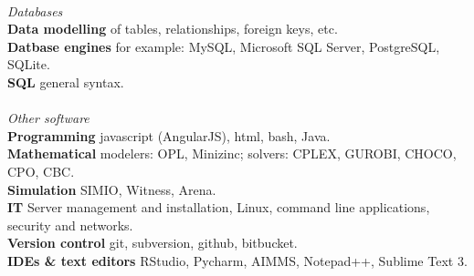 		\\\textsl{Databases}\\	
					\hspace*{2ex}\textbf{Data modelling} of tables, relationships, foreign keys, etc.\\
					\hspace*{2ex}\textbf{Datbase engines} for example: MySQL, Microsoft SQL Server, PostgreSQL, SQLite.\\
					\hspace*{2ex}\textbf{SQL} general syntax.\\
		\\\textsl{Other software}\\				
			\hspace*{2ex}\textbf{Programming} javascript (AngularJS), html, bash, Java. \\
			\hspace*{2ex}\textbf{Mathematical} modelers: OPL, Minizinc; solvers: CPLEX, GUROBI, CHOCO, CPO, CBC. \\
			\hspace*{2ex}\textbf{Simulation} SIMIO, Witness, Arena. \\
			\hspace*{2ex}\textbf{IT} Server management and installation, Linux, command line applications, security and networks. \\
			\hspace*{2ex}\textbf{Version control} git, subversion, github, bitbucket. \\
			\hspace*{2ex}\textbf{IDEs \& text editors} RStudio, Pycharm, AIMMS, Notepad++, Sublime Text 3.\\

